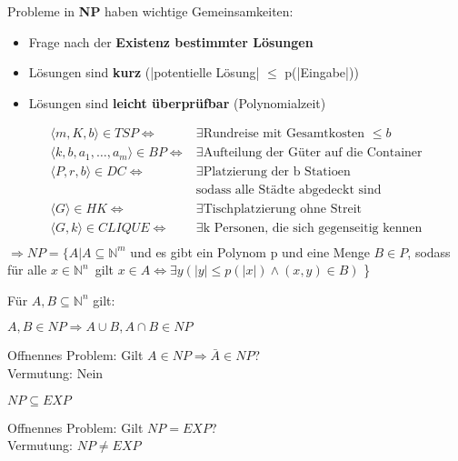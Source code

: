 \documentclass[14pt]{article}
\begin{document}
\begin{definition} [NP = Nichtdeterministische Polynomialzeit]
    Probleme in \textbf{NP} haben wichtige Gemeinsamkeiten:
    \begin{itemize}
        \item Frage nach der \textbf{Existenz bestimmter Lösungen}
        \item Lösungen sind \textbf{kurz} (|potentielle Lösung| $\leq$ p(|Eingabe|))
        \item Lösungen sind \textbf{leicht überprüfbar} (Polynomialzeit)
    \end{itemize}
    \begin{equation*}
        \begin{split}
            \langle m, K, b \rangle \in TSP \Leftrightarrow & \exists 
            \text{Rundreise mit Gesamtkosten } \leq b \\
            \langle k, b, a_1, \dots, a_m \rangle \in BP \Leftrightarrow & \exists
            \text{Aufteilung der Güter auf die Container} \\
            \langle P, r, b \rangle \in DC \Leftrightarrow & \exists
            \text{Platzierung der b Statioen} \\ &
            \text{sodass alle Städte abgedeckt sind} \\
            \langle G \rangle \in HK \Leftrightarrow & \exists
            \text{Tischplatzierung ohne Streit} \\
            \langle G, k \rangle \in CLIQUE \Leftrightarrow & \exists
            \text{k Personen, die sich gegenseitig kennen} \\
        \end{split}        
    \end{equation*}
    $\Rightarrow NP = \{ A | A \subseteq \mathbb{N}^m$ und es gibt ein Polynom p und eine Menge 
    $B \in P$, sodass für alle $x \in \mathbb{N}^n$\ gilt $x \in A \Leftrightarrow 
    \exists y(|y| \leq p(|x|) \land (x, y) \in B)$ \}
\end{definition}
\begin{eigenschaft}
    Für $A, B \subseteq \mathbb{N}^n$ gilt:
    \begin{center}
        $A, B \in NP \Rightarrow A \cup B, A \cap B \in NP$
    \end{center}
    Offnennes Problem: Gilt $A \in NP \Rightarrow \bar{A} \in NP$? \\
    Vermutung: Nein
\end{eigenschaft}
\begin{eigenschaft}
    \begin{center}
        $NP \subseteq EXP$
    \end{center}
    Offnennes Problem: Gilt $NP = EXP$? \\
    Vermutung: $NP \neq EXP$
\end{eigenschaft}
\end{document}
